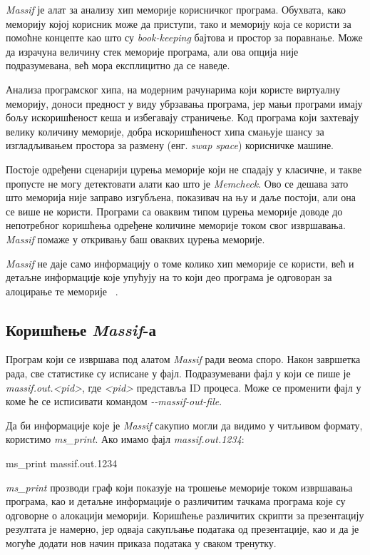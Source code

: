 \documentclass[12pt,oneside]{memoir}
\begin{document}
\indent \textit{Massif} је алат за анализу хип меморије корисничког програма. Обухвата, како меморију којој корисник може да приступи, тако и меморију која се користи за помоћне концепте као што су \textit{book-keeping} бајтова и простор за поравнање. Може да израчуна величину стек меморије програма, али ова опција није подразумевана, већ мора експлицитно да се наведе.

\indent Анализа програмског хипа, на модерним рачунарима који користе виртуалну меморију, доноси предност у виду убрзавања програма, јер мањи програми имају бољу искоришћеност кеша и избегавају страничење. Код програма који захтевају велику количину меморије, добра искоришћеност хипа смањује шансу за изгладљивањем простора за размену (енг. \textit{swap space}) корисничке машине.

\indent Постоје одређени сценарији цурења меморије који не спадају у класичне, и такве пропусте не могу детектовати алати као што је \textit{Memcheck}. Ово се дешава зато што меморија није заправо изгубљена, показивач на њу и даље постоји, али она се више не користи. Програми са оваквим типом цурења меморије доводе до непотребног коришћења одређене количине меморије током свог извршавања. \textit{Massif} помаже у откривању баш оваквих цурења меморије.

\indent \textit{Massif} не даје само информацију о томе колико хип меморије се користи, већ и детаљне информације које упућују на то који део програма је одговоран за алоцирање те меморије ~\cite{massifdRef}.

\subsection{Коришћење \textit{Massif}-а}


\indent Програм који се извршава под алатом \textit{Massif} ради веома споро. Након завршетка рада, све статистике су исписане у фајл. Подразумевани фајл у који се пише је \textit{massif.out.<pid>}, где \textit{<pid>} представља ID процеса. Може се променити фајл у коме ће се исписивати командом \textit{-\--massif-out-file}.

\indent Да би информације које је \textit{Massif} сакупио могли да видимо у читљивом формату, користимо \textit{ms\_print}. Ако имамо фајл \textit{massif.out.1234}: 


\begin{center}
 ms\_print massif.out.1234
\end{center}

\indent \textit{ms\_print} прозводи граф који показује на трошење меморије током извршавања програма, као и детаљне информације о различитим тачкама програма које су одговорне о алокацији меморији. Коришћење различитих скрипти за презентацију резултата је намерно, јер одваја сакупљање података од презентације, као и да је могуће додати нов начин приказа података у сваком тренутку.
\end{document}
